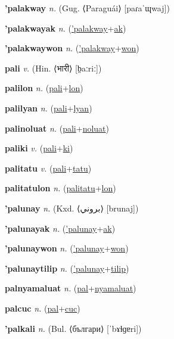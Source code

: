 \textbf{\hypertarget{'palakway}{'palakway}} \textit{n.} (Gug. ⟨Paraguái⟩ [paɾaˈɰwaj])


\textbf{\hypertarget{'palakwayak}{'palakwayak}} \textit{n.} (\hyperlink{'palakway}{'palakway}+\allowbreak \hyperlink{ak}{ak})


\textbf{\hypertarget{'palakwaywon}{'palakwaywon}} \textit{n.} (\hyperlink{'palakway}{'palakway}+\allowbreak \hyperlink{won}{won})


\textbf{\hypertarget{pali}{pali}} \textit{v.} (Hin. ⟨{\devanagari{}भारी}⟩ [b̤aːriː])


\textbf{\hypertarget{palilon}{palilon}} \textit{n.} (\hyperlink{pali}{pali}+\allowbreak \hyperlink{lon}{lon})


\textbf{\hypertarget{palilyan}{palilyan}} \textit{n.} (\hyperlink{pali}{pali}+\allowbreak \hyperlink{lyan}{lyan})


\textbf{\hypertarget{palinoluat}{palinoluat}} \textit{n.} (\hyperlink{pali}{pali}+\allowbreak \hyperlink{noluat}{noluat})


\textbf{\hypertarget{paliki}{paliki}} \textit{v.} (\hyperlink{pali}{pali}+\allowbreak \hyperlink{ki}{ki})


\textbf{\hypertarget{palitatu}{palitatu}} \textit{v.} (\hyperlink{pali}{pali}+\allowbreak \hyperlink{tatu}{tatu})


\textbf{\hypertarget{palitatulon}{palitatulon}} \textit{n.} (\hyperlink{palitatu}{palitatu}+\allowbreak \hyperlink{lon}{lon})


\textbf{\hypertarget{'palunay}{'palunay}} \textit{n.} (Kxd. ⟨{\arabics{}بروني}⟩ [brunaj])


\textbf{\hypertarget{'palunayak}{'palunayak}} \textit{n.} (\hyperlink{'palunay}{'palunay}+\allowbreak \hyperlink{ak}{ak})


\textbf{\hypertarget{'palunaywon}{'palunaywon}} \textit{n.} (\hyperlink{'palunay}{'palunay}+\allowbreak \hyperlink{won}{won})


\textbf{\hypertarget{'palunaytilip}{'palunaytilip}} \textit{n.} (\hyperlink{'palunay}{'palunay}+\allowbreak \hyperlink{tilip}{tilip})


\textbf{\hypertarget{palnyamaluat}{palnyamaluat}} \textit{n.} (\hyperlink{pal}{pal}+\allowbreak \hyperlink{nyamaluat}{nyamaluat})


\textbf{\hypertarget{palcuc}{palcuc}} \textit{n.} (\hyperlink{pal}{pal}+\allowbreak \hyperlink{cuc}{cuc})


\textbf{\hypertarget{'palkali}{'palkali}} \textit{n.} (Bul. ⟨българи⟩ [ˈbɤɫɡɐri])



